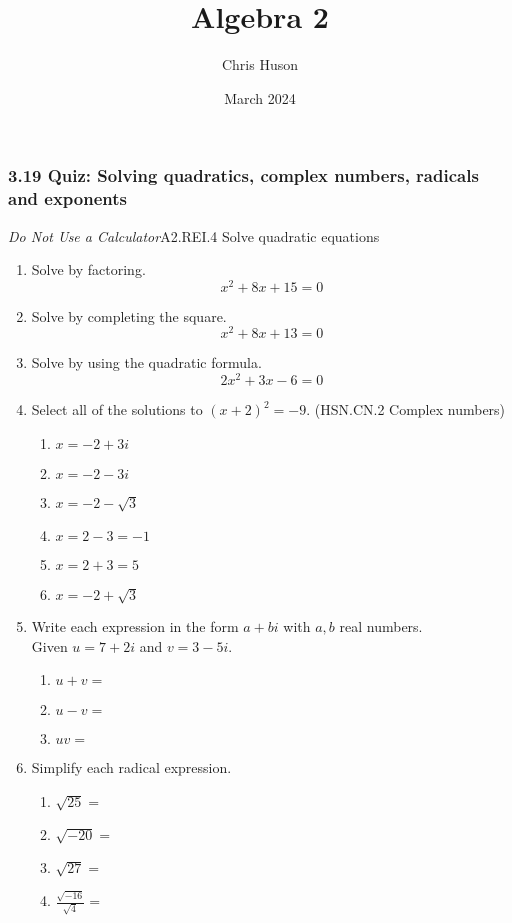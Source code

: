\documentclass[12pt, twoside]{article}
\title{Algebra 2}
\author{Chris Huson}
\date{March 2024}
\begin{document}
\subsubsection*{3.19 Quiz: Solving quadratics, complex numbers, radicals and exponents}
\emph{Do Not Use a Calculator}\hfill A2.REI.4 Solve quadratic equations
\begin{enumerate}

\item Solve by factoring.
$$x^2 + 8x + 15 = 0$$ \vspace{3cm}

\item Solve by completing the square.
$$x^2 + 8x + 13 = 0$$ \vspace{6cm}

\item Solve by using the quadratic formula.
$$2x^2 + 3x - 6 = 0$$ \vspace{4cm}

\newpage 
\item Select all of the solutions to $(x+2)^2= -9$. \hfill (HSN.CN.2 Complex numbers)
    \begin{multicols}{2}
    \begin{enumerate}
        \item $x= -2+3i$
        \item $x= -2-3i$
        \item $x= -2 - \sqrt{3}$
        \item $x= 2 -3 = -1$
        \item $x= 2+3 = 5$
        \item $x= -2 + \sqrt{3}$
    \end{enumerate}
    \end{multicols}

\item Write each expression in the form $a+bi$ with $a,b$ real numbers. \\[0.25cm]
    Given  $u = 7 + 2i $ and $v = 3- 5i$.
        \begin{enumerate}[itemsep=1.5cm]
            \item $u+v =$
            \item $u-v =$
            \item $uv =$
        \end{enumerate} \vspace{3cm}

\item Simplify each radical expression.
    \begin{multicols}{2}
    \begin{enumerate}[itemsep=0.5cm]
        \item $\sqrt{25}=$
        \item $\sqrt{-20}=$
        \item $\sqrt{27}=$
        \item $\displaystyle \frac{\sqrt{-16}}{\sqrt{4}}=$
    \end{enumerate}
    \end{multicols} \vspace{2cm}


\end{enumerate}
\end{document}
